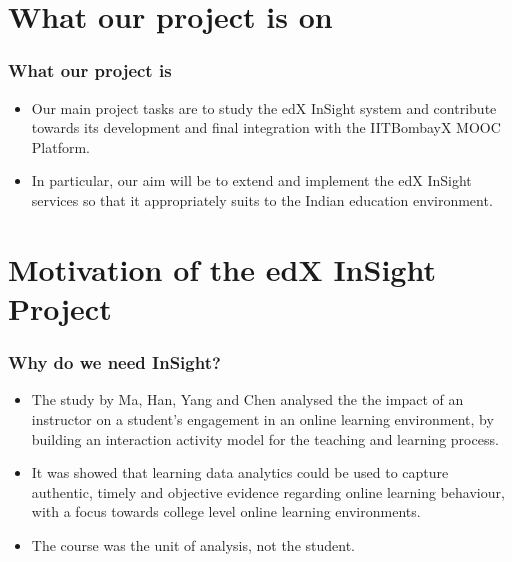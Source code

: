 \documentclass[12pt,xcolor=dvipsnames]{beamer}
\begin{document}
\section{What our project is on}
\begin{frame}[t]
\frametitle{What our project is}

\begin{itemize}

\item Our main project tasks are to study the edX InSight system and contribute towards its development and final integration
with the IITBombayX MOOC Platform.

\item In particular, our aim will be to extend and implement the edX InSight services so that it appropriately suits to the 
Indian education environment.

\end{itemize}
\end{frame}

\section{Motivation of the edX InSight Project}
\begin{frame}[t]
\frametitle{Why do we need InSight?}

\begin{itemize}
\item The study by Ma, Han, Yang and Chen analysed the the impact of an instructor on a student’s engagement in an online learning environment, by building an interaction activity model for the teaching and learning process.

\item It was showed that learning data analytics could be used
to capture authentic, timely and objective evidence regarding online learning behaviour, with a focus
towards college level online learning environments.

\item The course was the unit of analysis, not the student.

\end{itemize}
\end{frame}
\end{document}
